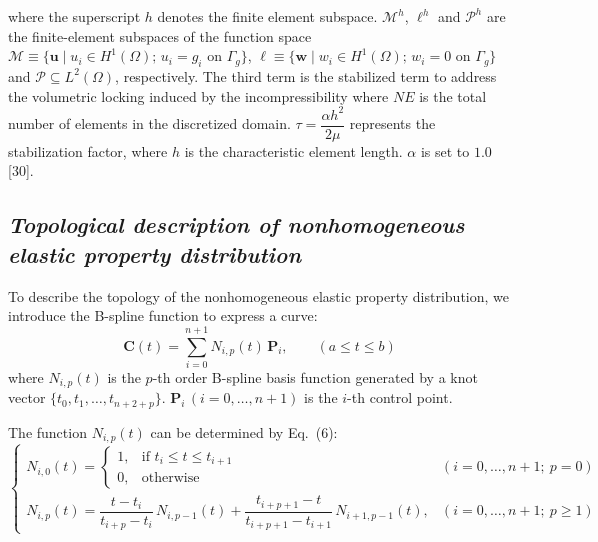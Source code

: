 \documentclass[11pt]{article}
\begin{document}
\noindent
where the superscript $h$ denotes the finite element subspace.
$\mathscr{M}^h$, $\ell^h$ and $\mathscr{P}^h$ are the finite-element
subspaces of the function space
$\mathscr{M} \equiv \{\mathbf{u} \mid u_i \in H^1(\Omega);\,
u_i = g_i \text{ on } \Gamma_g\}$,
$\ell \equiv \{\mathbf{w} \mid w_i \in H^1(\Omega);\,
w_i = 0 \text{ on } \Gamma_g\}$ and
$\mathscr{P} \subseteq L^2(\Omega)$, respectively. The third term is
the stabilized term to address the volumetric locking induced by the
incompressibility where $NE$ is the total number of elements in the
discretized domain. $\tau = \dfrac{\alpha h^{2}}{2\mu}$ represents the
stabilization factor, where $h$ is the characteristic element length.
$\alpha$ is set to $1.0$ [30].

\subsection*{\textit{Topological description of nonhomogeneous elastic property distribution}}

\noindent
To describe the topology of the nonhomogeneous elastic property
distribution, we introduce the B-spline function to express a curve:
\begin{equation}
\mathbf{C}(t) = \sum_{i=0}^{n+1} N_{i,p}(t)\,\mathbf{P}_i,
\qquad (a \leq t \leq b)
\end{equation}
where $N_{i,p}(t)$ is the $p$-th order B-spline basis function
generated by a knot vector $\{t_0, t_1, \ldots, t_{n+2+p}\}$.
$\mathbf{P}_i\,(i = 0, \ldots, n+1)$ is the $i$-th control point.

The function $N_{i,p}(t)$ can be determined by Eq.~(6):
\begin{equation}
\begin{cases}
N_{i,0}(t) =
\begin{cases}
1, & \text{if } t_i \leq t \leq t_{i+1} \\
0, & \text{otherwise}
\end{cases}
& (i = 0, \ldots, n+1;\ p = 0) \\[3.5ex]
N_{i,p}(t) = \dfrac{t - t_i}{t_{i+p} - t_i}\,N_{i,p-1}(t)
+ \dfrac{t_{i+p+1} - t}{t_{i+p+1} - t_{i+1}}\,N_{i+1,p-1}(t),
& (i = 0, \ldots, n+1;\ p \geq 1)
\end{cases}
\end{equation}
\end{document}
